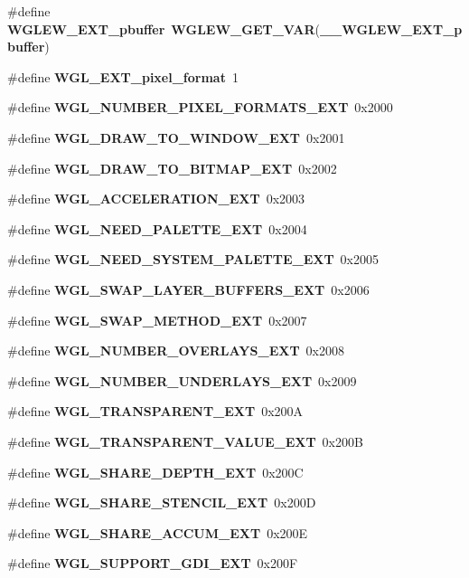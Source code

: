 \begin{DoxyCompactItemize}
\item 
\#define {\bf W\+G\+L\+E\+W\+\_\+\+E\+X\+T\+\_\+pbuffer}~{\bf W\+G\+L\+E\+W\+\_\+\+G\+E\+T\+\_\+\+V\+AR}({\bf \+\_\+\+\_\+\+W\+G\+L\+E\+W\+\_\+\+E\+X\+T\+\_\+pbuffer})
\item 
\#define {\bf W\+G\+L\+\_\+\+E\+X\+T\+\_\+pixel\+\_\+format}~1
\item 
\#define {\bf W\+G\+L\+\_\+\+N\+U\+M\+B\+E\+R\+\_\+\+P\+I\+X\+E\+L\+\_\+\+F\+O\+R\+M\+A\+T\+S\+\_\+\+E\+XT}~0x2000
\item 
\#define {\bf W\+G\+L\+\_\+\+D\+R\+A\+W\+\_\+\+T\+O\+\_\+\+W\+I\+N\+D\+O\+W\+\_\+\+E\+XT}~0x2001
\item 
\#define {\bf W\+G\+L\+\_\+\+D\+R\+A\+W\+\_\+\+T\+O\+\_\+\+B\+I\+T\+M\+A\+P\+\_\+\+E\+XT}~0x2002
\item 
\#define {\bf W\+G\+L\+\_\+\+A\+C\+C\+E\+L\+E\+R\+A\+T\+I\+O\+N\+\_\+\+E\+XT}~0x2003
\item 
\#define {\bf W\+G\+L\+\_\+\+N\+E\+E\+D\+\_\+\+P\+A\+L\+E\+T\+T\+E\+\_\+\+E\+XT}~0x2004
\item 
\#define {\bf W\+G\+L\+\_\+\+N\+E\+E\+D\+\_\+\+S\+Y\+S\+T\+E\+M\+\_\+\+P\+A\+L\+E\+T\+T\+E\+\_\+\+E\+XT}~0x2005
\item 
\#define {\bf W\+G\+L\+\_\+\+S\+W\+A\+P\+\_\+\+L\+A\+Y\+E\+R\+\_\+\+B\+U\+F\+F\+E\+R\+S\+\_\+\+E\+XT}~0x2006
\item 
\#define {\bf W\+G\+L\+\_\+\+S\+W\+A\+P\+\_\+\+M\+E\+T\+H\+O\+D\+\_\+\+E\+XT}~0x2007
\item 
\#define {\bf W\+G\+L\+\_\+\+N\+U\+M\+B\+E\+R\+\_\+\+O\+V\+E\+R\+L\+A\+Y\+S\+\_\+\+E\+XT}~0x2008
\item 
\#define {\bf W\+G\+L\+\_\+\+N\+U\+M\+B\+E\+R\+\_\+\+U\+N\+D\+E\+R\+L\+A\+Y\+S\+\_\+\+E\+XT}~0x2009
\item 
\#define {\bf W\+G\+L\+\_\+\+T\+R\+A\+N\+S\+P\+A\+R\+E\+N\+T\+\_\+\+E\+XT}~0x200A
\item 
\#define {\bf W\+G\+L\+\_\+\+T\+R\+A\+N\+S\+P\+A\+R\+E\+N\+T\+\_\+\+V\+A\+L\+U\+E\+\_\+\+E\+XT}~0x200B
\item 
\#define {\bf W\+G\+L\+\_\+\+S\+H\+A\+R\+E\+\_\+\+D\+E\+P\+T\+H\+\_\+\+E\+XT}~0x200C
\item 
\#define {\bf W\+G\+L\+\_\+\+S\+H\+A\+R\+E\+\_\+\+S\+T\+E\+N\+C\+I\+L\+\_\+\+E\+XT}~0x200D
\item 
\#define {\bf W\+G\+L\+\_\+\+S\+H\+A\+R\+E\+\_\+\+A\+C\+C\+U\+M\+\_\+\+E\+XT}~0x200E
\item 
\#define {\bf W\+G\+L\+\_\+\+S\+U\+P\+P\+O\+R\+T\+\_\+\+G\+D\+I\+\_\+\+E\+XT}~0x200F
\item 

\end{DoxyCompactItemize}
